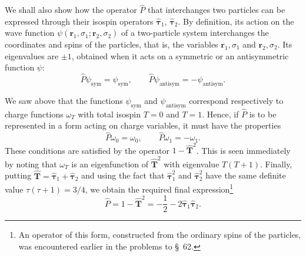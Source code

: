 We shall also show how the operator $\hat P$ that interchanges two particles
can be expressed through their isospin operators
$\hat{\boldsymbol\tau}_1$, $\hat{\boldsymbol\tau}_2$. By definition, its action
on the wave function $\psi(\mathbf r_1,\sigma_1;\mathbf r_2,\sigma_2)$ of a
two-particle system interchanges the coordinates and spins of the particles,
that is, the variables $\mathbf r_1,\sigma_1$ and
$\mathbf r_2,\sigma_2$. Its eigenvalues are $\pm1$, obtained when it acts on a
symmetric or an antisymmetric function $\psi$:
\begin{equation}
 \hat P\psi_{\text{sym}}=\psi_{\text{sym}},\qquad
 \hat P\psi_{\text{antisym}}=-\psi_{\text{antisym}}.
 \tag{116.2}
\end{equation}

We saw above that the functions $\psi_{\text{sym}}$ and
$\psi_{\text{antisym}}$ correspond respectively to charge functions
$\omega_T$ with total isospin $T=0$ and $T=1$. Hence, if $\hat P$ is to be
represented in a form acting on charge variables, it must have the properties
\begin{equation}
 \hat P\omega_0=\omega_0,\qquad \hat P\omega_1=-\omega_1.
 \tag{116.3}
\end{equation}
These conditions are satisfied by the operator $1-\hat{\mathbf T}^2$. This is
seen immediately by noting that $\omega_T$ is an eigenfunction of
$\hat{\mathbf T}^2$ with eigenvalue $T(T+1)$. Finally, putting
$\hat{\mathbf T}=\hat{\boldsymbol\tau}_1+\hat{\boldsymbol\tau}_2$ and using the
fact that $\hat{\boldsymbol\tau}_1^2$ and $\hat{\boldsymbol\tau}_2^2$ have the
same definite value $\tau(\tau+1)=3/4$, we obtain the required final
expression\footnote{An operator of this form, constructed from the ordinary
spins of the particles, was encountered earlier in the problems to \S~62.}
\begin{equation}
 \hat P=1-\hat{\mathbf T}^2=-\frac12
 -2\hat{\boldsymbol\tau}_1\hat{\boldsymbol\tau}_2.
 \tag{116.4}
\end{equation}

